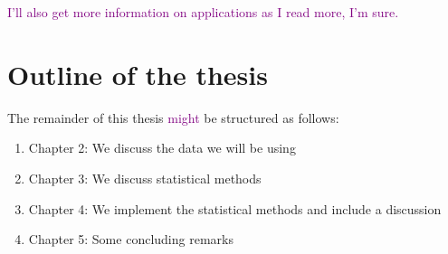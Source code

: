 \documentclass[twoside,12pt,bibstyle=chem-acs]{reedthesis}
\begin{document}
\textcolor{purple}{I'll also get more information on applications as I read more, I'm sure.}

\section{Outline of the thesis}
The remainder of this thesis \textcolor{purple}{might} be structured as follows:

\begin{enumerate}
\itemsep0em
\item[] Chapter 2: We discuss the data we will be using
\item[] Chapter 3: We discuss statistical methods
\item[] Chapter 4: We implement the statistical methods and include a discussion
\item[] Chapter 5: Some concluding remarks
\end{enumerate}


 







\printbibliography[heading=bibintoc]
\end{document}
